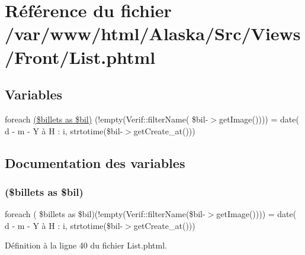 \hypertarget{_front_2_list_8phtml}{}\section{Référence du fichier /var/www/html/\+Alaska/\+Src/\+Views/\+Front/\+List.phtml}
\label{_front_2_list_8phtml}
\subsection*{Variables}
\begin{DoxyCompactItemize}
\item 
foreach \hyperlink{_front_2_list_8phtml_a8e0c0a104325d525b4080fdfbdc4327a}{(\$billets as \$bil)} (!empty(Verif\+::filter\+Name( \$bil-\/$>$get\+Image()))) = date(\textquotesingle{} d -\/ m -\/ Y à H \+: i\textquotesingle{}, strtotime(\$bil-\/$>$get\+Create\+\_\+at()))
\end{DoxyCompactItemize}


\subsection{Documentation des variables}
\mbox{\label{_front_2_list_8phtml_a8e0c0a104325d525b4080fdfbdc4327a}} 
\subsubsection{\texorpdfstring{(\$billets as \$bil)}{($billets as $bil)}}
{\footnotesize\ttfamily foreach ( \$billets as \$bil)(!empty(Verif\+::filter\+Name(\$bil-\/$>$get\+Image()))) = date(\textquotesingle{} d -\/ m -\/ Y à H \+: i\textquotesingle{}, strtotime(\$bil-\/$>$get\+Create\+\_\+at()))}



Définition à la ligne 40 du fichier List.\+phtml.

